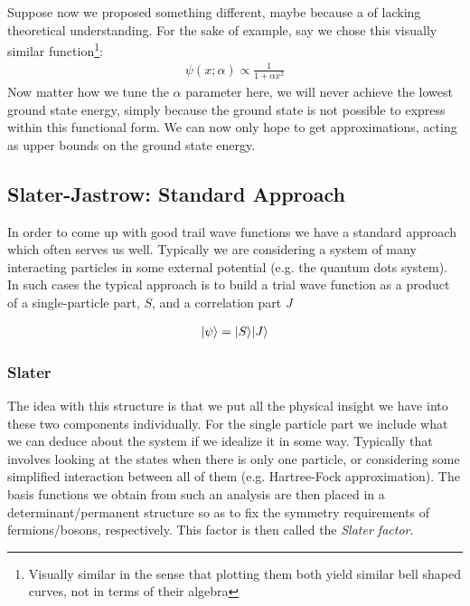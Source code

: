 \documentclass[Thesis.tex]{subfiles}
\begin{document}
Suppose now we proposed something different, maybe because a of lacking theoretical
understanding. For the sake of example, say we chose this visually similar
function\footnote{Visually similar in the sense that plotting them both yield similar bell
shaped curves, not in terms of their algebra}:
\begin{align}
    \psi(x; \alpha)\propto \frac{1}{1 + \alpha x^2}
\end{align}
Now matter how we tune the $\alpha$ parameter here, we will never achieve the lowest
ground state energy, simply because the ground state is not possible to express within this
functional form. We can now only hope to get approximations, acting as upper bounds on the
ground state energy.

\subsection{Slater-Jastrow: Standard Approach}
\label{sec:slater-jastrow}

In order to come up with good trail wave functions we have a standard approach which often
serves us well. Typically we are considering a system of many interacting particles in
some external potential (e.g. the quantum dots system). In such cases the typical approach
is to build a trial wave function as a product of a single-particle part, $S$, and a correlation
part $J$

\begin{align}
    | \psi \rangle = | S \rangle | J \rangle
\end{align}

\subsubsection*{Slater}

The idea with this structure is that we put all the physical insight we have into these
two components individually. For the single particle part we include what we can deduce
about the system if we idealize it in some way. Typically that involves looking at the
states when there is only one particle, or considering some simplified interaction between
all of them (e.g. Hartree-Fock approximation). The basis functions we obtain from such an
analysis are then placed in a determinant/permanent structure so as to fix the symmetry
requirements of fermions/bosons, respectively. This factor is then called the \emph{Slater
factor}.
\end{document}
